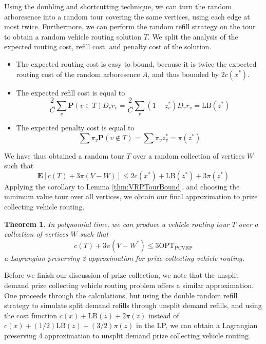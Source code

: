 \documentclass{article}
\theoremstyle{plain}
\theoremstyle{plain}
\newtheorem{theorem}{Theorem}
\begin{document}
Using the doubling and shortcutting technique, we can turn the random arboresence into a random tour covering the same vertices, using each edge at most twice. Furthermore, we can perform the random refill strategy on the tour to obtain a random vehicle routing solution $T$. We split the analysis of the expected routing cost, refill cost, and penalty cost of the solution.
%
\begin{itemize}
    \item The expected routing cost is easy to bound, because it is twice the expected routing cost of the random arboresence $A$, and thus bounded by $2c(x^*)$.

    \item The expected refill cost is equal to
    \[ \frac{2}{C} \sum_v \mathbf{P}(v \in T) D_v r_v = \frac{2}{C} \sum_v (1 - z^*_v) D_vr_v = \text{LB}(z^*) \]

    \item The expected penalty cost is equal to
    \[ \sum \pi_v \mathbf{P}(v \not \in T) = \sum \pi_vz^*_v = \pi(z^*) \]
\end{itemize}
%
We have thus obtained a random tour $T$ over a random collection of vertices $W$ such that
%
\[ \mathbf{E}[c(T) + 3\pi(V - W)] \leq 2c(x^*) + \text{LB}(z^*) + 3\pi(z^*) \]
%
Applying the corollary to Lemma \ref{thm:VRPTourBound}, and choosing the minimum value tour over all vertices, we obtain our final approximation to prize collecting vehicle routing.

\begin{theorem}
    In polynomial time, we can produce a vehicle routing tour $T$ over a collection of vertices $W$ such that
    \[ c(T) + 3\pi(V - W^*) \leq 3 \text{OPT}_{\text{PCVRP}} \]
    a Lagrangian preserving 3 approximation for prize collecting vehicle routing.
\end{theorem}

Before we finish our discussion of prize collection, we note that the unsplit demand prize collecting vehicle routing problem offers a similar approximation. One proceeds through the calculations, but using the double random refill strategy to simulate split demand refills through unsplit demand refills, and using the cost function $c(x) + \text{LB}(z) + 2 \pi(z)$ instead of $c(x) + (1/2) \text{LB}(z) + (3/2) \pi(z)$ in the LP, we can obtain a Lagrangian preserving 4 approximation to unsplit demand prize collecting vehicle routing.

\end{document}
